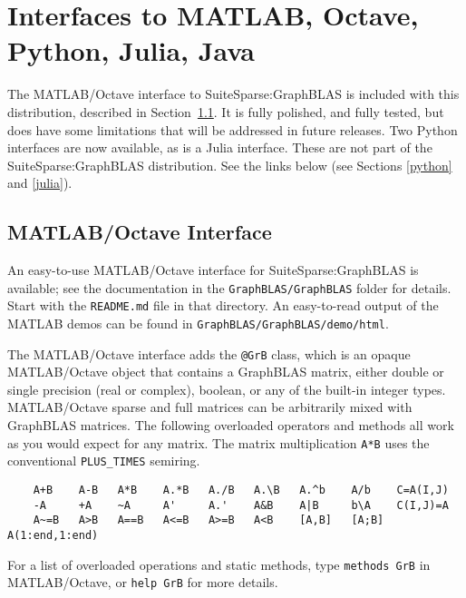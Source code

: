 \documentclass[12pt]{article}
\begin{document}
\section{Interfaces to MATLAB, Octave, Python, Julia, Java} %

The MATLAB/Octave interface to SuiteSparse:GraphBLAS is included with this
distribution, described in Section~\ref{octave}.
It is fully polished, and fully tested, but does have
some limitations that will be addressed in future releases.
Two Python interfaces are now available, as is a
Julia interface.  These are not part of the SuiteSparse:GraphBLAS distribution.
See the links below (see Sections \ref{python} and \ref{julia}).

\subsection{MATLAB/Octave Interface}
\label{octave}

An easy-to-use MATLAB/Octave interface for SuiteSparse:GraphBLAS is available;
see the documentation in the \verb'GraphBLAS/GraphBLAS' folder for details.
Start with the \verb'README.md' file in that directory.  An easy-to-read output
of the MATLAB demos can be found in \verb'GraphBLAS/GraphBLAS/demo/html'.

The MATLAB/Octave interface adds the \verb'@GrB' class, which is an opaque
MATLAB/Octave object that contains a GraphBLAS matrix, either double or single
precision (real or complex), boolean, or any of the built-in integer types.
MATLAB/Octave sparse and full matrices can be arbitrarily mixed with GraphBLAS
matrices.  The following overloaded operators and methods all work as you would
expect for any matrix.  The matrix multiplication \verb'A*B' uses the
conventional \verb'PLUS_TIMES' semiring.

{\footnotesize
\begin{verbatim}
    A+B    A-B   A*B    A.*B   A./B   A.\B   A.^b    A/b    C=A(I,J)
    -A     +A    ~A     A'     A.'    A&B    A|B     b\A    C(I,J)=A
    A~=B   A>B   A==B   A<=B   A>=B   A<B    [A,B]   [A;B]  A(1:end,1:end) \end{verbatim}}

For a list of overloaded operations and static methods, type
\verb'methods GrB' in MATLAB/Octave, or \verb'help GrB' for more details.
\end{document}
